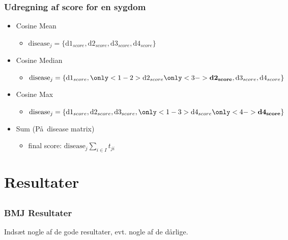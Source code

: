 \documentclass[xcolor=table]{beamer}
\begin{document}
\begin{frame}

  \frametitle{Udregning af score for en sygdom}
  
  \begin{itemize}
    \item Cosine Mean
      \begin{itemize}
        \item $ \textrm{disease}_j = \{\textrm{d1}_{score}, \textrm{d2}_{score}, \textrm{d3}_{score}, \textrm{d4}_{score} \} $
      \end{itemize}
    \item Cosine Median
      \begin{itemize}
        \item $ \textrm{disease}_j = \{\textrm{d1}_{score}, \only<1-2>{\textrm{d2}_{score}} \only<3->{\textbf{d2}_{\mathbf{score}}}, \textrm{d3}_{score}, \textrm{d4}_{score} \} $
      \end{itemize}
    \item Cosine Max
      \begin{itemize}
        \item $ \textrm{disease}_j = \{\textrm{d1}_{score}, \textrm{d2}_{score}, \textrm{d3}_{score}, \only<1-3>{\textrm{d4}_{score}} \only<4->{\textbf{d4}_{\mathbf{score}}} \} $
      \end{itemize}
    \item Sum (P\aa\ disease matrix)
      \begin{itemize}
        \item final score: $\textrm{disease}_j \sum_{i \in I} t_{ji} $
      \end{itemize}
  \end{itemize}

\end{frame}

\section{Resultater}

\subsection*{}

\begin{frame}

  \frametitle{BMJ Resultater}

  Inds\ae t nogle af de gode resultater, evt. nogle af de d\aa rlige.

\end{frame}
\end{document}
